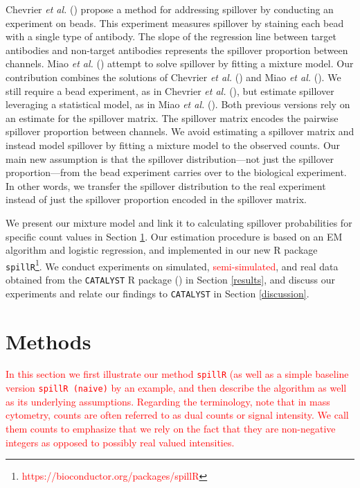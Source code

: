 \documentclass[
]{article}
\begin{document}
Chevrier \emph{et al.} () propose a method for addressing spillover by conducting an experiment on beads. This experiment measures spillover by staining each bead with a single type of antibody. The slope of the regression line between target antibodies and non-target antibodies represents the spillover proportion between channels. Miao \emph{et al.} () attempt to solve spillover by fitting a mixture model. Our contribution combines the solutions of Chevrier \emph{et al.} () and Miao \emph{et al.} (). We still require a bead experiment, as in Chevrier \emph{et al.} (), but estimate spillover leveraging a statistical model, as in Miao \emph{et al.} (). Both previous versions rely on an estimate for the spillover matrix. The spillover matrix encodes the pairwise spillover proportion between channels. We avoid estimating a spillover matrix and instead model spillover by fitting a mixture model to the observed counts. Our main new assumption is that the spillover distribution---not just the spillover proportion---from the bead experiment carries over to the biological experiment. In other words, we transfer the spillover distribution to the real experiment instead of just the spillover proportion encoded in the spillover matrix.

We present our mixture model and link it to calculating spillover probabilities for specific count values in Section \ref{methods}. Our estimation procedure is based on an EM algorithm and logistic regression, and implemented in our new R package \texttt{spillR}\footnote{\textcolor{red}{https://bioconductor.org/packages/spillR}}. We conduct experiments on simulated, \textcolor{red}{semi-simulated}, and real data obtained from the \texttt{CATALYST} R package () in Section \ref{results}, and discuss our experiments and relate our findings to \texttt{CATALYST} in Section \ref{discussion}.

\section{Methods}\label{methods}

\textcolor{red}{
In this section we first illustrate our method \texttt{spillR} (as well as a simple baseline version \texttt{spillR (naive)} by an example, and then describe the algorithm as well as its underlying assumptions. Regarding the terminology, note that in mass cytometry, counts are often referred to as dual counts or signal intensity. We call them counts to emphasize that we rely on the fact that they are non-negative integers as opposed to possibly real valued intensities. 
}
\end{document}
